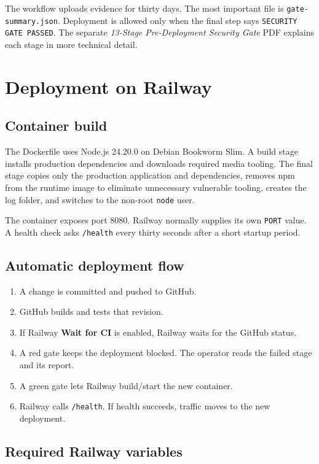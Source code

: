 \documentclass[11pt,a4paper]{article}
\begin{document}
The workflow uploads evidence for thirty days. The most important file is \texttt{gate-summary.json}. Deployment is allowed only when the final step says \texttt{SECURITY GATE PASSED}. The separate \textit{13-Stage Pre-Deployment Security Gate} PDF explains each stage in more technical detail.

\section{Deployment on Railway}

\subsection{Container build}

The Dockerfile uses Node.js 24.20.0 on Debian Bookworm Slim. A build stage installs production dependencies and downloads required media tooling. The final stage copies only the production application and dependencies, removes npm from the runtime image to eliminate unnecessary vulnerable tooling, creates the log folder, and switches to the non-root \texttt{node} user.

The container exposes port 8080. Railway normally supplies its own \texttt{PORT} value. A health check asks \texttt{/health} every thirty seconds after a short startup period.

\subsection{Automatic deployment flow}

\begin{enumerate}
  \item A change is committed and pushed to GitHub.
  \item GitHub builds and tests that revision.
  \item If Railway \textbf{Wait for CI} is enabled, Railway waits for the GitHub status.
  \item A red gate keeps the deployment blocked. The operator reads the failed stage and its report.
  \item A green gate lets Railway build/start the new container.
  \item Railway calls \texttt{/health}. If health succeeds, traffic moves to the new deployment.
\end{enumerate}

\subsection{Required Railway variables}
\end{document}
